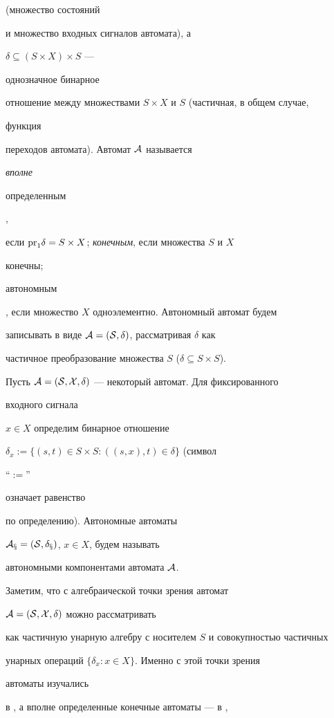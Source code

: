 (множество состояний


и множество входных сигналов автомата), а


$\delta\subseteq(S\times X)\times S$ ---


однозначное бинарное


отношение между множествами $S\times X$ и $S$ (частичная, в общем случае,


функция


переходов автомата). Автомат $\cal A$ называется {\em вполне


определенным},


если $\mathrm{pr}_1\delta=S\times X$; {\em конечным}, если множества $S$ и $X$


конечны; {\em


автономным}, если множество $X$ одноэлементно. Автономный автомат будем


записывать в виде $\cal A=(S,\delta)$, рассматривая $\delta$ как


частичное преобразование множества $S$ ($\delta\subseteq S\times S$).





Пусть $\cal A=(S,X,\delta)$ --- некоторый автомат. Для фиксированного


входного сигнала


$x\in X$ определим бинарное отношение


$\delta_x:=\{(s,t)\in S\times S:((s,x),t)\in\delta\}$ (символ


``{}$:=${}''


означает равенство


по определению). Автономные автоматы


$\cal A_x=(S,\delta_x)$, $x\in X$, будем называть \cite{Sa1}


автономными компонентами автомата $\cal A$.





Заметим, что с алгебраической точки зрения автомат


$\cal A=(S,X,\delta)$ можно рассматривать


как частичную унарную алгебру с носителем $S$ и совокупностью частичных


унарных операций $\{\delta_x:x\in X\}$. Именно с этой точки зрения


автоматы изучались


в \cite{Sor}, а вполне определенные конечные автоматы --- в \cite{Sa1},


